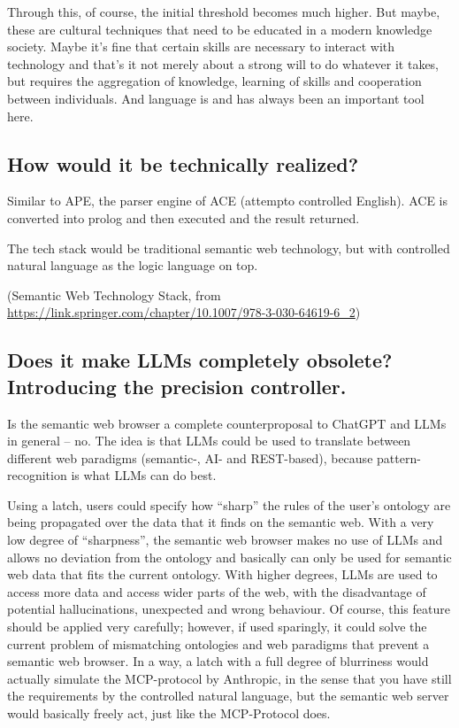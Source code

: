 \documentclass[12pt,a4paper]{article}
\begin{document}
Through this, of course, the initial threshold becomes much higher. But maybe, these are cultural techniques that need to be educated in a modern knowledge society. Maybe it's fine that certain skills are necessary to interact with technology and that's it not merely about a strong will to do whatever it takes, but requires the aggregation of knowledge, learning of skills and cooperation between individuals. And language is and has always been an important tool here.

\subsection{How would it be technically realized?}

Similar to APE, the parser engine of ACE (attempto controlled English). ACE is converted into prolog and then executed and the result returned.

The tech stack would be traditional semantic web technology, but with controlled natural language as the logic language on top.

(Semantic Web Technology Stack, from \url{https://link.springer.com/chapter/10.1007/978-3-030-64619-6_2})

\subsection{Does it make LLMs completely obsolete? Introducing the precision controller.}

Is the semantic web browser a complete counterproposal to ChatGPT and LLMs in general -- no. The idea is that LLMs could be used to translate between different web paradigms (semantic-, AI- and REST-based), because pattern-recognition is what LLMs can do best.

Using a latch, users could specify how ``sharp'' the rules of the user's ontology are being propagated over the data that it finds on the semantic web. With a very low degree of ``sharpness'', the semantic web browser makes no use of LLMs and allows no deviation from the ontology and basically can only be used for semantic web data that fits the current ontology. With higher degrees, LLMs are used to access more data and access wider parts of the web, with the disadvantage of potential hallucinations, unexpected and wrong behaviour. Of course, this feature should be applied very carefully; however, if used sparingly, it could solve the current problem of mismatching ontologies and web paradigms that prevent a semantic web browser. In a way, a latch with a full degree of blurriness would actually simulate the MCP-protocol by Anthropic, in the sense that you have still the requirements by the controlled natural language, but the semantic web server would basically freely act, just like the MCP-Protocol does.
\end{document}
